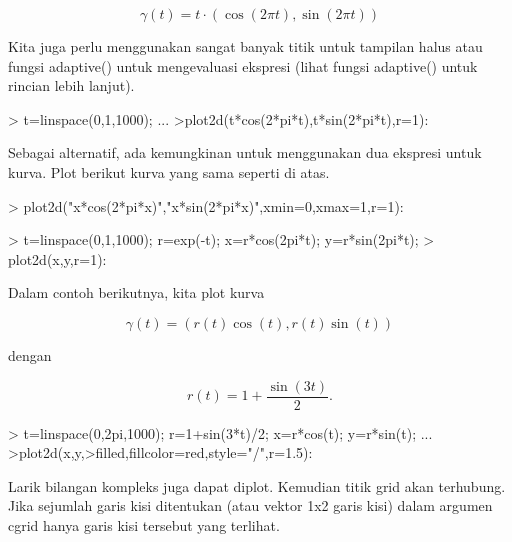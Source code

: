 \documentclass{report}
\begin{document}
\begin{eulernotebook}
\begin{eulercomment}
\begin{eulercomment}
\begin{eulercomment}
\begin{eulercomment}
\begin{eulercomment}
\end{eulercomment}
\begin{eulerformula}
\[
\gamma(t) = t \cdot (\cos(2\pi t),\sin(2\pi t))
\]
\end{eulerformula}
\begin{eulercomment}
Kita juga perlu menggunakan sangat banyak titik untuk tampilan halus
atau fungsi adaptive() untuk mengevaluasi ekspresi (lihat fungsi
adaptive() untuk rincian lebih lanjut).
\end{eulercomment}
\begin{eulerprompt}
> t=linspace(0,1,1000); ...
>plot2d(t*cos(2*pi*t),t*sin(2*pi*t),r=1):
\end{eulerprompt}
\begin{eulercomment}
Sebagai alternatif, ada kemungkinan untuk menggunakan dua ekspresi
untuk kurva. Plot berikut kurva yang sama seperti di atas.
\end{eulercomment}
\begin{eulerprompt}
> plot2d("x*cos(2*pi*x)","x*sin(2*pi*x)",xmin=0,xmax=1,r=1):
\end{eulerprompt}
\begin{eulerprompt}
> t=linspace(0,1,1000); r=exp(-t); x=r*cos(2pi*t); y=r*sin(2pi*t);
> plot2d(x,y,r=1):
\end{eulerprompt}
\begin{eulercomment}
Dalam contoh berikutnya, kita plot kurva

\end{eulercomment}
\begin{eulerformula}
\[
\gamma(t) = (r(t) \cos(t), r(t) \sin(t))
\]
\end{eulerformula}
\begin{eulercomment}
dengan

\end{eulercomment}
\begin{eulerformula}
\[
r(t) = 1 + \dfrac{\sin(3t)}{2}.
\]
\end{eulerformula}
\begin{eulerprompt}
> t=linspace(0,2pi,1000); r=1+sin(3*t)/2; x=r*cos(t); y=r*sin(t); ...
>plot2d(x,y,>filled,fillcolor=red,style="/",r=1.5):
\end{eulerprompt}
\begin{eulercomment}
Larik bilangan kompleks juga dapat diplot. Kemudian titik grid akan
terhubung. Jika sejumlah garis kisi ditentukan (atau vektor 1x2 garis
kisi) dalam argumen cgrid hanya garis kisi tersebut yang terlihat.


\end{eulercomment}
\end{eulercomment}
\end{eulercomment}
\end{eulercomment}
\end{eulercomment}
\end{eulernotebook}
\end{document}
